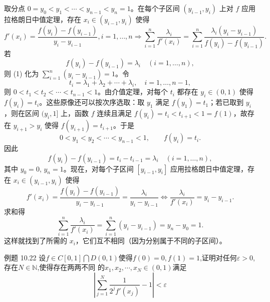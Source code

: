 \begin{solution}
取分点 $0 = y_0 < y_1 < \cdots < y_{n-1} < y_n = 1$。在每个子区间 $(y_{i-1},y_i)$ 上对 $f$ 应用拉格朗日中值定理，存在 $x_i \in (y_{i-1},y_i)$ 使得
\[
f'(x_i) = \frac{f(y_i) - f(y_{i-1})}{y_i - y_{i-1}},  i=1,\dots,n\Rightarrow \sum_{i=1}^n \frac{\lambda_i}{f'(x_i)} = \sum_{i=1}^n \frac{\lambda_i (y_i - y_{i-1})}{f(y_i) - f(y_{i-1})}. \tag{1}
\]
若
\[
f(y_i) - f(y_{i-1}) = \lambda_i \quad (i=1,\dots,n),
\]
则 (1) 化为 $\displaystyle\sum_{i=1}^n (y_i - y_{i-1}) = 1$。令
\[
t_i = \lambda_1 + \lambda_2 + \cdots + \lambda_i, \quad i=1,\dots,n-1,
\]
则 $0 < t_1 < t_2 < \cdots < t_{n-1} < 1$。由介值定理，对每个 $t_i$ 都存在 $y_i \in (0,1)$ 使得 $f(y_i)=t_i$。这些原像还可以按次序选取：取 $y_1$ 满足 $f(y_1)=t_1$；若已取到 $y_i$，则在区间 $(y_i,1]$ 上，函数 $f$ 连续且满足 $f(y_i)=t_i<t_{i+1}<1=f(1)$，故存在 $y_{i+1}>y_i$ 使得 $f(y_{i+1})=t_{i+1}$。于是
\[
0<y_1<y_2<\cdots<y_{n-1}<1,\qquad f(y_i)=t_i.
\]
因此
\[
f(y_i)-f(y_{i-1}) = t_i - t_{i-1} = \lambda_i \quad (i=1,\dots,n),
\]
其中 $y_0=0$, $y_n=1$。现在，对每个子区间 $[y_{i-1},y_i]$ 应用拉格朗日中值定理，存在 $x_i \in (y_{i-1},y_i)$ 使得
\[
f'(x_i) = \frac{f(y_i)-f(y_{i-1})}{y_i-y_{i-1}} = \frac{\lambda_i}{y_i-y_{i-1}}\Leftrightarrow \frac{\lambda_i}{f'(x_i)} = y_i - y_{i-1}.
\]
求和得
\[
\sum_{i=1}^n \frac{\lambda_i}{f'(x_i)} = \sum_{i=1}^n (y_i - y_{i-1}) = y_n - y_0 = 1.
\]
这样就找到了所需的 $x_i$，它们互不相同（因为分别属于不同的子区间）。
\end{solution}
\newpage
\begin{example}[$\left|\sum_{j=1}^N\frac1{2^jf'\left(x_j\right)}-1\right|<\varepsilon$]
    例题 10.22 设$f\in C\left[0,1\right]\bigcap D\left(0,1\right)$使得$f\left(0\right)=0,f\left(1\right)=1$,证明对任何$\varepsilon>0$,存在$N\in\mathbb{N}$,使得存在两两不同
的$x_1,x_2,\cdots,x_N\in(0,1)$满足$$\left|\sum_{j=1}^N\frac1{2^jf'\left(x_j\right)}-1\right|<\varepsilon$$
\end{example}
